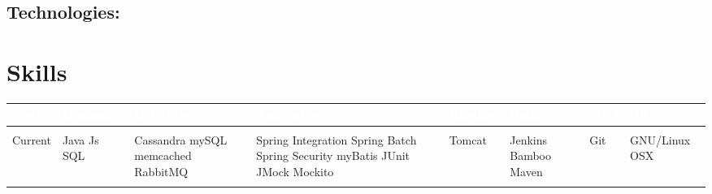 \documentclass[a4paper]{article}
\begin{document}
\subsection*{Technologies:} 


\section*{\LARGE{Skills\newline}} 

\begin{tabular}{| >{\centering\arraybackslash}m{1.2cm} |  >{\centering\arraybackslash}m{1.8cm} |  >{\centering\arraybackslash}m{2cm}  |  >{\centering\arraybackslash}m{2.8cm}  |  >{\centering\arraybackslash}m{1.4cm}  |  >{\centering\arraybackslash}m{1.2cm}  |  >{\centering\arraybackslash}m{0.8cm} |  >{\centering\arraybackslash}m{1.6cm}  |} \hline 
	\cellcolor{black}\textcolor{white}{State} & \cellcolor{black}\textcolor{white}{Languages} & \cellcolor{black}\textcolor{white}{Data Store} & \cellcolor{black}\textcolor{white}{Application} & \cellcolor{black}\textcolor{white}{Runtime} & \cellcolor{black}\textcolor{white}{Build} & \cellcolor{black}\textcolor{white}{SCM} & \cellcolor{black}\textcolor{white}{OS} \\ \hline  
	      & 	  & 	       &             &         &       &     &    \\
	Current & Java \newline Js \newline SQL \newline & Cassandra \newline mySQL \newline memcached \newline RabbitMQ & Spring Integration \newline Spring Batch \newline Spring Security \newline myBatis \newline JUnit \newline JMock \newline Mockito \newline & Tomcat & Jenkins \newline Bamboo \newline Maven & Git & GNU/Linux \newline OSX \\ \hline
	& & & & & & & \\

\end{tabular}
\end{document}
